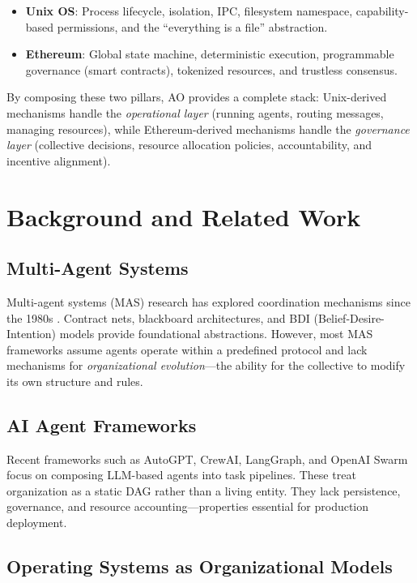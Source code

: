 \documentclass[11pt,a4paper]{article}
\begin{document}
\begin{itemize}[nosep]
  \item \textbf{Unix OS}: Process lifecycle, isolation, IPC, filesystem
    namespace, capability-based permissions, and the ``everything is a file''
    abstraction.
  \item \textbf{Ethereum}: Global state machine, deterministic execution,
    programmable governance (smart contracts), tokenized resources, and
    trustless consensus.
\end{itemize}

By composing these two pillars, AO provides a complete stack: Unix-derived
mechanisms handle the \emph{operational layer} (running agents, routing
messages, managing resources), while Ethereum-derived mechanisms handle the
\emph{governance layer} (collective decisions, resource allocation policies,
accountability, and incentive alignment).

\section{Background and Related Work}

\subsection{Multi-Agent Systems}

Multi-agent systems (MAS) research has explored coordination mechanisms since
the 1980s \cite{wooldridge2009}. Contract nets, blackboard architectures, and
BDI (Belief-Desire-Intention) models provide foundational abstractions.
However, most MAS frameworks assume agents operate within a predefined protocol
and lack mechanisms for \emph{organizational evolution}---the ability for the
collective to modify its own structure and rules.

\subsection{AI Agent Frameworks}

Recent frameworks such as AutoGPT, CrewAI, LangGraph, and OpenAI Swarm focus
on composing LLM-based agents into task pipelines. These treat organization as
a static DAG rather than a living entity. They lack persistence, governance,
and resource accounting---properties essential for production deployment.

\subsection{Operating Systems as Organizational Models}
\end{document}
